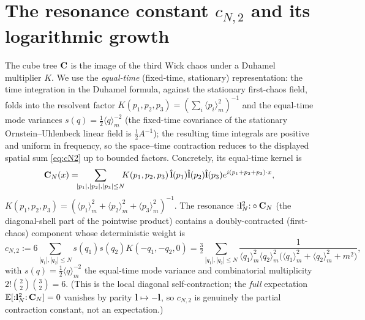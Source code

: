 \section*{The resonance constant $c_{N,2}$ and its logarithmic growth}

The cube tree $\mathbf{C}$ is the image of the third Wick chaos under a Duhamel
multiplier $K$. We use the \emph{equal-time} (fixed-time, stationary) representation: the
time integration in the Duhamel formula, against the stationary first-chaos field, folds
into the resolvent factor $K(p_1,p_2,p_3)=(\sum_i\langle p_i\rangle_m^2)^{-1}$ and the
equal-time mode variances $s(q)=\tfrac12\langle q\rangle_m^{-2}$ (the fixed-time
covariance of the stationary Ornstein--Uhlenbeck linear field is $\tfrac12A^{-1}$); the
resulting time integrals are positive and uniform in frequency, so the space--time
contraction reduces to the displayed spatial sum \eqref{eq:cN2} up to bounded factors.
Concretely, its equal-time kernel is
\begin{equation}\label{eq:Ckernel}
\mathbf{C}_N(x)=\!\!\!\sum_{|p_1|,|p_2|,|p_3|\le N}\!\!\!K(p_1,p_2,p_3)\,\hat{\mathbf{l}}(p_1)\hat{\mathbf{l}}(p_2)\hat{\mathbf{l}}(p_3)e^{i(p_1+p_2+p_3)\cdot x},
\end{equation}
$K(p_1,p_2,p_3)=(\langle p_1\rangle_m^2+\langle p_2\rangle_m^2+\langle p_3\rangle_m^2)^{-1}$.
The resonance ${:}\mathbf{l}_N^2{:}\circ\mathbf{C}_N$ (the diagonal-shell part of the
pointwise product) contains a doubly-contracted (first-chaos) component whose
deterministic weight is
\begin{equation}\label{eq:cN2}
c_{N,2}:=6\!\!\sum_{|q_1|,|q_2|\le N}\!\!s(q_1)s(q_2)K(-q_1,-q_2,0)
=\tfrac32\!\!\sum_{|q_1|,|q_2|\le N}\!\!\frac{1}{\langle q_1\rangle_m^2\langle q_2\rangle_m^2\bigl(\langle q_1\rangle_m^2+\langle q_2\rangle_m^2+m^2\bigr)},
\end{equation}
with $s(q)=\tfrac12\langle q\rangle_m^{-2}$ the equal-time mode variance and
combinatorial multiplicity $2!\binom22\binom32=6$. (This is the local diagonal
self-contraction; the \emph{full} expectation $\mathbb{E}[{:}\mathbf{l}_N^2{:}\,\mathbf{C}_N]=0$
vanishes by parity $\mathbf{l}\mapsto-\mathbf{l}$, so $c_{N,2}$ is genuinely the partial
contraction constant, not an expectation.)

